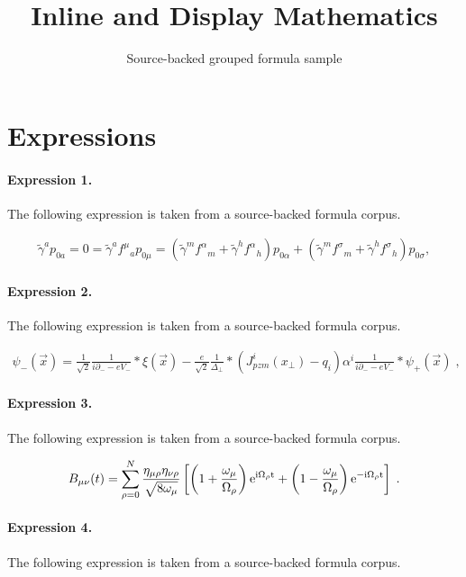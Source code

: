 \documentclass[11pt]{article}
\title{Inline and Display Mathematics}
\author{Source-backed grouped formula sample}
\date{}
\begin{document}
\maketitle
\section{Expressions}
\paragraph{Expression 1.} The following expression is taken from a source-backed formula corpus.

\begin{align*}\tilde{\gamma}^{a} p_{0a} = 0 = \tilde{\gamma}^{a} f^{\mu}{ }_ap_{0\mu} = (\tilde{\gamma}^{m} f^{\alpha}{ }_m +\tilde{\gamma}^{h} f^{\alpha}{ }_h )p_{0\alpha} + (\tilde{\gamma}^{m} f^{\sigma}{ }_m +\tilde{\gamma}^{h} f^{\sigma}{ }_h ) p_{0\sigma},\end{align*}

\paragraph{Expression 2.} The following expression is taken from a source-backed formula corpus.

\begin{align*}\psi_{-}(\vec{x}) = \frac{1}{\sqrt{2}} \frac{1}{i\partial_{-} -e V_{-}} \ast \xi (\vec{x}) - \frac{e}{\sqrt{2}}\frac{1}{\Delta_{\perp}} \ast (J_{pzm}^i (x_\perp) - q_{i} )\alpha^i \frac{1}{i\partial_{-} - e V_{-}} \ast\psi_{+} (\vec{x}) \;, \end{align*}

\paragraph{Expression 3.} The following expression is taken from a source-backed formula corpus.

\begin{align*}B_{\mu\nu}(t)=\sum_{\rho=0}^N\frac{\eta_{\mu\rho}\eta_{\nu\rho}}{\sqrt{8\omega_\mu}}\left[\left(1+\frac{\omega_\mu}{\Omega_\rho}\right)\rm{e}^{i\Omega_\rho t}+\left(1-\frac{\omega_\mu}{\Omega_\rho}\right)\rm{e}^{-i\Omega_\rho t}\right]\;.\end{align*}

\paragraph{Expression 4.} The following expression is taken from a source-backed formula corpus.
\end{document}
